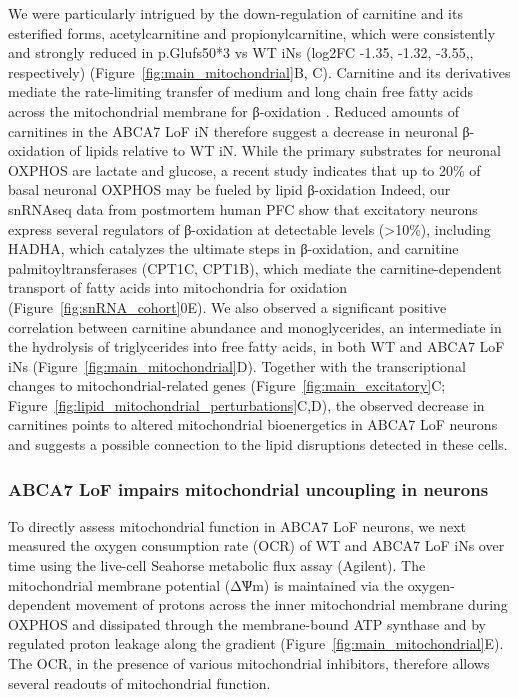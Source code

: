 We were particularly intrigued by the down-regulation of carnitine and its esterified forms, acetylcarnitine and propionylcarnitine, which were consistently and strongly reduced in p.Glufs50*3 vs WT iNs  (log2FC -1.35, -1.32, -3.55,, respectively) (Figure~\ref{fig:main_mitochondrial}B, C). Carnitine and its derivatives mediate the rate-limiting transfer of medium and long chain free fatty acids across the mitochondrial membrane for β-oxidation \cite{noauthor_2016-la,noauthor_2004-tm}. Reduced amounts of carnitines in the ABCA7 LoF iN therefore suggest a decrease in neuronal β-oxidation of lipids relative to WT iN. While the primary substrates for neuronal OXPHOS are lactate and glucose\cite{Dienel2018-dt,Trigo2022-ym,Yellen2018-kr}, a recent study indicates that up to 20\% of basal neuronal OXPHOS may be fueled by lipid β-oxidation\cite{Morant-Ferrando2023-va} Indeed, our snRNAseq data from postmortem human PFC show that excitatory neurons express several regulators of β-oxidation at detectable levels (>10\%), including HADHA, which catalyzes the ultimate steps in β-oxidation, and carnitine palmitoyltransferases (CPT1C, CPT1B), which mediate the carnitine-dependent transport of fatty acids into mitochondria for oxidation (Figure~\ref{fig:snRNA_cohort}0E). We also observed a significant positive correlation between carnitine abundance and monoglycerides, an intermediate in the hydrolysis of triglycerides into free fatty acids, in both WT and ABCA7 LoF iNs (Figure~\ref{fig:main_mitochondrial}D). Together with the transcriptional changes to mitochondrial-related genes (Figure~\ref{fig:main_excitatory}C; Figure~\ref{fig:lipid_mitochondrial_perturbations}C,D), the observed decrease in carnitines  points to altered mitochondrial bioenergetics in ABCA7 LoF neurons and suggests a possible connection to the lipid disruptions detected in these cells.

\subsubsection{ABCA7 LoF impairs mitochondrial uncoupling in neurons}
To directly assess mitochondrial function in ABCA7 LoF neurons, we next measured the oxygen consumption rate (OCR) of WT and ABCA7 LoF iNs over time using the live-cell Seahorse metabolic flux assay (Agilent). The mitochondrial membrane potential (ΔѰm) is maintained via the oxygen-dependent movement of protons across the inner mitochondrial membrane during OXPHOS and dissipated through the membrane-bound ATP synthase and by regulated proton leakage along the gradient (Figure~\ref{fig:main_mitochondrial}E). The OCR, in the presence of various mitochondrial inhibitors, therefore allows several readouts of mitochondrial function\cite{Divakaruni2014-eq}.

